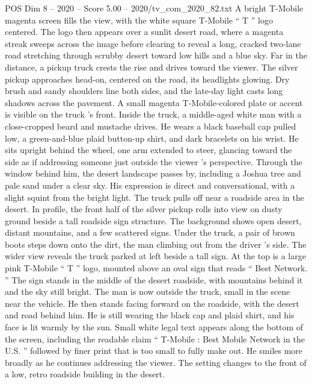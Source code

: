 \begin{textsample}{POS Dim 8 – 2020 – Score 5.00 – 2020/tv\_com\_2020\_82.txt}  \label{ex:f8_pos_058}
A bright T-Mobile magenta screen fills the view, with the white square T-Mobile “ T ” logo centered.
The logo then appears over a sunlit desert road, where a magenta streak sweeps across the image before clearing to reveal a long, cracked two-lane road stretching through scrubby desert toward low hills and a blue sky.
Far in the distance, a pickup truck crests the rise and drives toward the viewer.
The silver pickup approaches head-on, centered on the road, its headlights glowing.
Dry brush and sandy shoulders line both sides, and the late-day light casts long shadows across the pavement.
A small magenta T-Mobile-colored plate or accent is visible on the truck ’s front.
Inside the truck, a middle-aged white man with a close-cropped beard and mustache drives.
He wears a black baseball cap pulled low, a green-and-blue plaid button-up shirt, and dark bracelets on his wrist.
He sits upright behind the wheel, one arm extended to steer, glancing toward the side as if addressing someone just outside the viewer ’s perspective.
Through the window behind him, the desert landscape passes by, including a Joshua tree and pale sand under a clear sky.
His expression is direct and conversational, with a slight squint from the bright light.
The truck pulls off near a roadside area in the desert.
In profile, the front half of the silver pickup rolls into view on dusty ground beside a tall roadside sign structure.
The background shows open desert, distant mountains, and a few scattered signs.
Under the truck, a pair of brown boots steps down onto the dirt, the man climbing out from the driver ’s side.
The wider view reveals the truck parked at left beside a tall sign.
At the top is a large pink T-Mobile “ T ” logo, mounted above an oval sign that reads “ Best Network. ” The sign stands in the middle of the desert roadside, with mountains behind it and the sky still bright.
The man is now outside the truck, small in the scene near the vehicle.
He then stands facing forward on the roadside, with the desert and road behind him.
He is still wearing the black cap and plaid shirt, and his face is lit warmly by the sun.
Small white legal text appears along the bottom of the screen, including the readable claim “ T-Mobile : Best Mobile Network in the U.S. ” followed by finer print that is too small to fully make out.
He smiles more broadly as he continues addressing the viewer.
The setting changes to the front of a low, retro roadside building in the desert.

\end{textsample}
